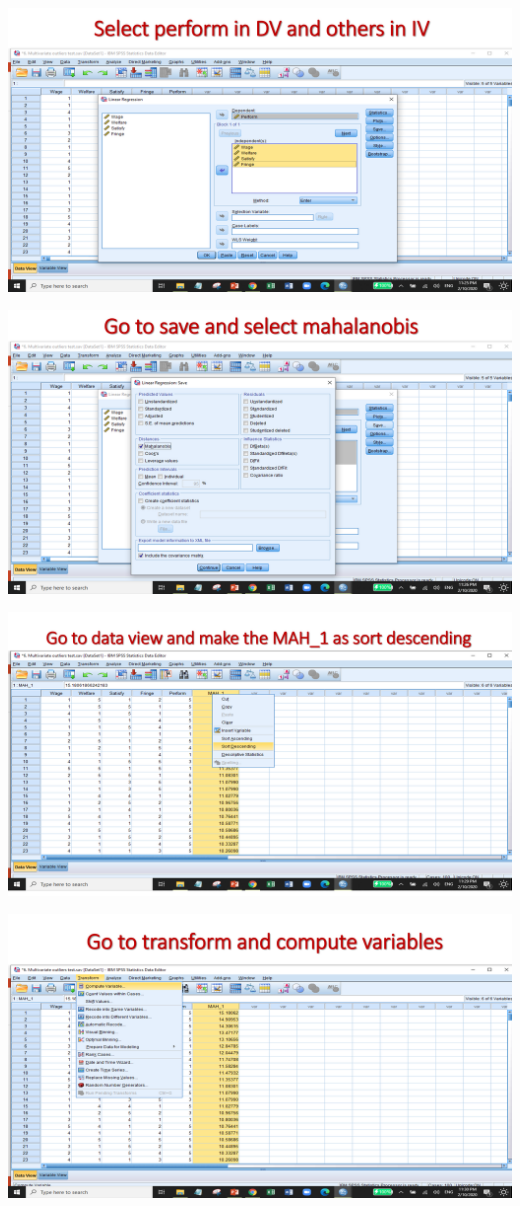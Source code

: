 \documentclass[
  letterpaper,
  DIV=11,
  numbers=noendperiod]{scrreprt}
\begin{document}
\includegraphics{images/slides/img_Page_050.png}

\includegraphics{images/slides/img_Page_051.png}

\includegraphics{images/slides/img_Page_052.png}

\includegraphics{images/slides/img_Page_053.png}
\end{document}
